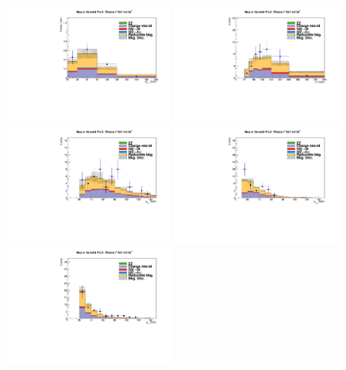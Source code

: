 \begin{figure}
\begin{center}
  \includegraphics[width=0.49\textwidth]{4_Analisys/pics/7TeV/plots/eet/f3/Full_charge3/final-f3-subMass-Full.pdf}
  \includegraphics[width=0.49\textwidth]{4_Analisys/pics/7TeV/plots/eet/f3/final-f3-LT-charge3.pdf}\\
  \includegraphics[width=0.49\textwidth]{4_Analisys/pics/7TeV/plots/eet/f3/Full_charge3/final-f3-e1Pt-Full.pdf}
  \includegraphics[width=0.49\textwidth]{4_Analisys/pics/7TeV/plots/eet/f3/Full_charge3/final-f3-e2Pt-Full.pdf}\\
  \includegraphics[width=0.49\textwidth]{4_Analisys/pics/7TeV/plots/eet/f3/Full_charge3/final-f3-tPt-Full.pdf}

\end{center}
\end{figure}
